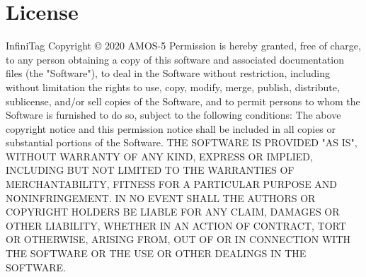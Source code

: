 \documentclass{article}
\begin{document}
\section{License}
InfiniTag Copyright © 2020 AMOS-5
Permission is hereby granted,
free of charge, to any person obtaining a copy of this software and
associated documentation files (the "Software"), to deal in the Software
without restriction, including without limitation the rights to use, copy,
modify, merge, publish, distribute, sublicense, and/or sell copies of the
Software, and to permit persons to whom the Software is furnished to do so,
subject to the following conditions: The above copyright notice and this
permission notice shall be included in all copies or substantial portions
of the Software. THE SOFTWARE IS PROVIDED "AS IS", WITHOUT WARRANTY OF ANY
KIND, EXPRESS OR IMPLIED, INCLUDING BUT NOT LIMITED TO THE WARRANTIES OF
MERCHANTABILITY, FITNESS FOR A PARTICULAR PURPOSE AND NONINFRINGEMENT. IN
NO EVENT SHALL THE AUTHORS OR COPYRIGHT HOLDERS BE LIABLE FOR ANY CLAIM,
DAMAGES OR OTHER LIABILITY, WHETHER IN AN ACTION OF CONTRACT, TORT OR
OTHERWISE, ARISING FROM, OUT OF OR IN CONNECTION WITH THE SOFTWARE OR THE
USE OR OTHER DEALINGS IN THE SOFTWARE.
\end{document}
